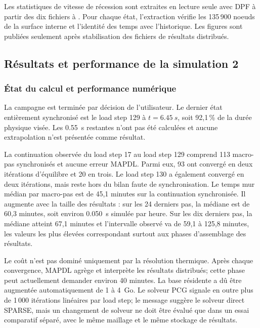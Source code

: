 \documentclass[oneside,openany]{amsdtx}
\begin{document}
Les statistiques de vitesse de récession sont extraites en lecture seule avec
DPF à partir des dix fichiers  à . Pour chaque
état, l'extraction vérifie les 135\,900 noeuds de la surface interne et
l'identité des temps avec l'historique. Les figures sont publiées seulement
après stabilisation des fichiers de résultats distribués.

\subsection{Résultats et performance de la simulation 2}

\subsubsection{État du calcul et performance numérique}

La campagne est terminée par décision de l'utilisateur. Le dernier état
entièrement synchronisé est le load step 129 à \(t=\SI{6.45}{s}\), soit
92,1\,\% de la durée physique visée. Les \SI{0.55}{s} restantes n'ont pas été
calculées et aucune extrapolation n'est présentée comme résultat.

La continuation observée du load step 17 au load step 129 comprend 113
macro-pas synchronisés et aucune erreur MAPDL. Parmi eux, 93 ont convergé en
deux itérations d'équilibre et 20 en trois. Le load step 130 a également
convergé en deux itérations, mais reste hors du bilan faute de synchronisation.
Le temps mur médian par macro-pas est de 45,1 minutes sur la continuation
synchronisée. Il augmente avec la taille des résultats : sur les 24 derniers
pas, la médiane est de 60,3 minutes, soit environ
\SI{0.050}{s} simulée par heure. Sur les dix derniers pas, la médiane atteint
67,1 minutes et l'intervalle observé va de 59,1 à 125,8 minutes, les valeurs
les plus élevées correspondant surtout aux phases d'assemblage des résultats.

Le coût n'est pas dominé uniquement par la résolution thermique. Après chaque
convergence, MAPDL agrège et interprète les résultats distribués; cette phase
peut actuellement demander environ 40 minutes. La base résidente a dû être
augmentée automatiquement de 1 à 4~Go. Le solveur PCG signale en outre plus de
1\,000 itérations linéaires par load step; le message suggère le solveur direct
SPARSE, mais un changement de solveur ne doit être évalué que dans un essai
comparatif séparé, avec le même maillage et le même stockage de résultats.
\end{document}
